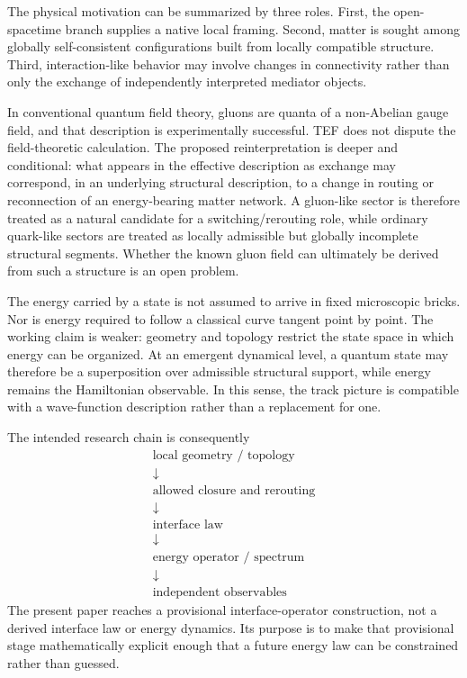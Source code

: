 \documentclass[10pt]{article}
\begin{document}
The physical motivation can be summarized by three roles. First, the open-spacetime branch supplies a native local framing. Second, matter is sought among globally self-consistent configurations built from locally compatible structure. Third, interaction-like behavior may involve changes in connectivity rather than only the exchange of independently interpreted mediator objects.

In conventional quantum field theory, gluons are quanta of a non-Abelian gauge field, and that description is experimentally successful. TEF does not dispute the field-theoretic calculation. The proposed reinterpretation is deeper and conditional: what appears in the effective description as exchange may correspond, in an underlying structural description, to a change in routing or reconnection of an energy-bearing matter network. A gluon-like sector is therefore treated as a natural candidate for a switching/rerouting role, while ordinary quark-like sectors are treated as locally admissible but globally incomplete structural segments. Whether the known gluon field can ultimately be derived from such a structure is an open problem.

The energy carried by a state is not assumed to arrive in fixed microscopic bricks. Nor is energy required to follow a classical curve tangent point by point. The working claim is weaker: geometry and topology restrict the state space in which energy can be organized. At an emergent dynamical level, a quantum state may therefore be a superposition over admissible structural support, while energy remains the Hamiltonian observable. In this sense, the track picture is compatible with a wave-function description rather than a replacement for one.

The intended research chain is consequently
\begin{equation}
\boxed{
\begin{gathered}
\text{local geometry / topology}\\[-0.1em]
\downarrow\\[-0.1em]
\text{allowed closure and rerouting}\\[-0.1em]
\downarrow\\[-0.1em]
\text{interface law}\\[-0.1em]
\downarrow\\[-0.1em]
\text{energy operator / spectrum}\\[-0.1em]
\downarrow\\[-0.1em]
\text{independent observables}
\end{gathered}}
\label{eq:programChain}
\end{equation}
The present paper reaches a provisional interface-operator construction, not a derived interface law or energy dynamics. Its purpose is to make that provisional stage mathematically explicit enough that a future energy law can be constrained rather than guessed.
\end{document}
